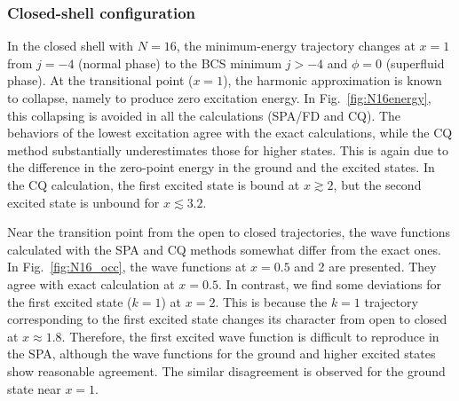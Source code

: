 \documentclass[11pt]{book} %
\begin{document}
\subsubsection{Closed-shell configuration}


In the closed shell with $N=16$,
the minimum-energy trajectory changes at $x=1$ from
$j=-4$ (normal phase) to
the BCS minimum $j>-4$ and $\phi=0$ (superfluid phase).
At the transitional point ($x=1$), the harmonic approximation is
known to collapse, namely to produce zero excitation energy.
In Fig.~\ref{fig:N16energy},
this collapsing is avoided in all the calculations (SPA/FD and CQ).
The behaviors of the lowest excitation agree with the exact calculations,
while the CQ method substantially underestimates those for higher states.
This is again due to the difference in the zero-point energy in
the ground and the excited states.
In the CQ calculation, the first excited state is bound at $x\gtrsim 2$,
but the second excited state is unbound for $x\lesssim 3.2$.

Near the transition point from the open to closed trajectories,
the wave functions calculated with the SPA and CQ methods somewhat differ
from the exact ones.
In Fig.~\ref{fig:N16_occ}, the wave functions at $x=0.5$ and 2 are presented.
They agree with exact calculation at $x=0.5$.
In contrast, we find some deviations for the first excited state ($k=1$)
at $x=2$.
This is because the $k=1$ trajectory corresponding to the first excited state
changes its character from open to closed at $x\approx 1.8$.
Therefore, the first excited wave function is difficult to reproduce in
the SPA, although the wave functions for
the ground and higher excited states show reasonable agreement.
The similar disagreement is observed for the ground state near $x=1$.
\end{document}

